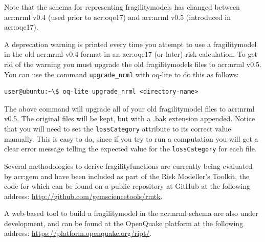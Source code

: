 Note that the schema for representing \glspl{fragilitymodel} has changed
between \gls{acr:nrml} v0.4 (used prior to \gls{acr:oqe17}) and \gls{acr:nrml}
v0.5 (introduced in \gls{acr:oqe17}).

A deprecation warning is printed every time you attempt to use a
\gls{fragilitymodel} in the old \gls{acr:nrml} v0.4 format in an
\gls{acr:oqe17} (or later) risk calculation. To get rid of the warning you
must upgrade the old \glspl{fragilitymodel} files to \gls{acr:nrml} v0.5. You
can use the command \Verb+upgrade_nrml+ with oq-lite to do this as follows:

\begin{verbatim}
user@ubuntu:~\$ oq-lite upgrade_nrml <directory-name>
\end{verbatim}

The above command will upgrade all of your old \gls{fragilitymodel} files to
\gls{acr:nrml} v0.5. The original files will be kept, but with a .bak extension
appended. Notice that you will need to set the \Verb+lossCategory+ attribute
to its correct value manually. This is easy to do, since if you try to run a
computation you will get a clear error message telling the expected value for
the \Verb+lossCategory+ for each file.


Several methodologies to derive \glspl{fragilityfunction} are currently being
evaluated by \gls{acr:gem} and have been included as part of the Risk
Modeller's Toolkit, the code for which can be found on a public repository at
GitHub at the following address: 
\href{http://github.com/gemsciencetools/rmtk}{http://github.com/gemsciencetools/rmtk}.

A web-based tool to build a \gls{fragilitymodel} in the \gls{acr:nrml} schema
are also under development, and can be found at the OpenQuake platform at the
following address: \href{https://platform.openquake.org/ript/}{https://platform.openquake.org/ript/}.